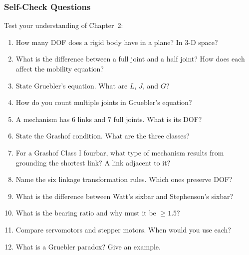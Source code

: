 \documentclass[10pt,aspectratio=43]{beamer}
\begin{document}
\begin{frame}
\frametitle{Self-Check Questions}

Test your understanding of Chapter~2:

\begin{enumerate}
  \item How many DOF does a rigid body have in a plane? In 3-D space?
  \item What is the difference between a full joint and a half joint? How does each affect the mobility equation?
  \item State Gruebler's equation. What are $L$, $J$, and $G$?
  \item How do you count multiple joints in Gruebler's equation?
  \item A mechanism has 6 links and 7 full joints. What is its DOF?
  \item State the Grashof condition. What are the three classes?
  \item For a Grashof Class I fourbar, what type of mechanism results from grounding the shortest link? A link adjacent to it?
  \item Name the six linkage transformation rules. Which ones preserve DOF?
  \item What is the difference between Watt's sixbar and Stephenson's sixbar?
  \item What is the bearing ratio and why must it be $\geq 1.5$?
  \item Compare servomotors and stepper motors. When would you use each?
  \item What is a Gruebler paradox? Give an example.
\end{enumerate}
\end{frame}
\end{document}
